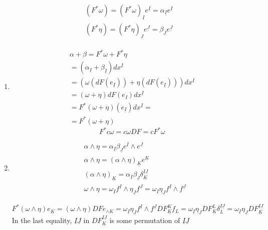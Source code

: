 \[
\begin{aligned}
  & (F^* \omega)  = (F^* \omega)_{\underline{I}} e^{\underline{I}} = \alpha_{\underline{I}} e^{ \underline{I}} \\ 
  &  (F^* \eta) = (F^* \eta)_{\underline{J}} e^{ \underline{J}} = \beta_{\underline{J}} e^{\underline{J}}
\end{aligned}
\]
\begin{enumerate}
\item[(a)] \[
\begin{gathered}
  \alpha + \beta  = F^* \omega + F^*\eta \\
  = (\alpha_{\underline{I}} + \beta_{\underline{I}} ) dx^{\underline{I}} \\
  = (\omega(dF(e_{\underline{I}} ) ) + \eta( dF(e_{\underline{I}})) )dx^{\underline{I}} \\
  = (\omega+ \eta) dF(e_I) dx^{\underline{I}} \\
  = F^*(\omega + \eta)(e_{\underline{I}})dx^{\underline{I}} = \\
  = F^*(\omega+ \eta)
\end{gathered}
\]
\[
F^*c\omega = c \omega DF = c F^*\omega
\]
\item[(b)] \[
\begin{aligned}
  & \alpha \wedge \eta = \alpha_{\underline{I}} \beta_{\underline{J}} e^{ \underline{I}} \wedge e^{ \underline{J}} \\
  & \alpha \wedge \eta = (\alpha \wedge \eta)_{\underline{K}} e^{ \underline{K}}  \\
  & (\alpha \wedge \eta)_{\underline{K}} = \alpha_{\underline{I}} \beta_{\underline{J}} \delta^{ \underline{I} \underline{J}}_{ \underline{K}}  \\
& \omega \wedge \eta = \omega_{\underline{I}} f^{\underline{I}} \wedge \eta_{\underline{J}} f^{\underline{J}} = \omega_{\underline{I}} \eta_{\underline{J}} f^{\underline{I}} \wedge f^{\underline{J}}
\end{aligned}
\]

\[
F^*(\omega \wedge \eta) e_{\underline{K}} = (\omega \wedge \eta) DF e_{\wedge{K}} = \omega_{\underline{I}} \eta_{\underline{J}} f^{ \underline{I}} \wedge f^{\underline{J}} DF^K_{ \underline{K}} f_L = \omega_{\underline{I}} \eta_{\underline{J}} DF^L_{\underline{K}} \delta^{ \underline{I} \underline{J}}_L = \omega_{\underline{I}} \eta_{\underline{J}} DF^{ \underline{I}\underline{J}}_{\underline{K}}
\]
In the last equality, $\underline{I} \underline{J}$ in $DF^{\underline{I}\underline{J}}_{\underline{K}}$ is some permutation of $\underline{I}\underline{J}$



\end{enumerate}
